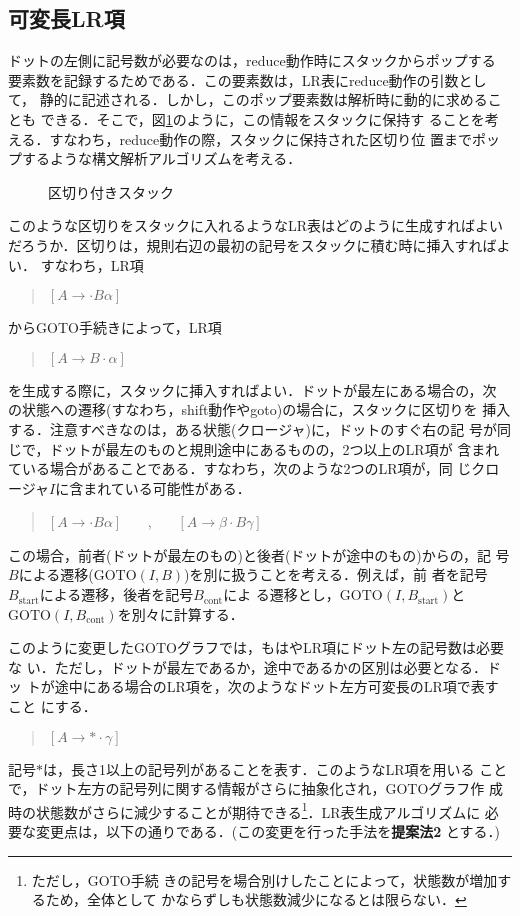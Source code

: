 \subsection{可変長LR項}

ドットの左側に記号数が必要なのは，reduce動作時にスタックからポップする
要素数を記録するためである．この要素数は，LR表にreduce動作の引数として，
静的に記述される．しかし，このポップ要素数は解析時に動的に求めることも
できる．そこで，図\ref{fig:stack}のように，この情報をスタックに保持す
ることを考える．すなわち，reduce動作の際，スタックに保持された区切り位
置までポップするような構文解析アルゴリズムを考える．

\begin{figure}
  \begin{center}
    \leavevmode
    \caption{区切り付きスタック}
    \label{fig:stack}
  \end{center}
\end{figure}

このような区切りをスタックに入れるようなLR表はどのように生成すればよい
だろうか．区切りは，規則右辺の最初の記号をスタックに積む時に挿入すればよい．
すなわち，LR項
\begin{quote}
  $[ A \rightarrow \cdot B \alpha ]$
\end{quote}
からGOTO手続きによって，LR項
\begin{quote}
  $[ A \rightarrow B \cdot \alpha ]$
\end{quote}
を生成する際に，スタックに挿入すればよい．ドットが最左にある場合の，次
の状態への遷移(すなわち，shift動作やgoto)の場合に，スタックに区切りを
挿入する．注意すべきなのは，ある状態(クロージャ)に，ドットのすぐ右の記
号が同じで，ドットが最左のものと規則途中にあるものの，2つ以上のLR項が
含まれている場合があることである．すなわち，次のような2つのLR項が，同
じクロージャ$I$に含まれている可能性がある．
\begin{quote}
  $[ A \rightarrow \cdot B \alpha ]$ ~~~,~~~ 
  $[ A \rightarrow \beta \cdot B \gamma ]$
\end{quote}
この場合，前者(ドットが最左のもの)と後者(ドットが途中のもの)からの，記
号$B$による遷移($\mbox{GOTO}(I,B)$)を別に扱うことを考える．例えば，前
者を記号$B_{\mbox{start}}$による遷移，後者を記号$B_{\mbox{cont}}$によ
る遷移とし，$\mbox{GOTO}(I,B_{\mbox{start}})$と
$\mbox{GOTO}(I,B_{\mbox{cont}})$を別々に計算する．

このように変更したGOTOグラフでは，もはやLR項にドット左の記号数は必要な
い．ただし，ドットが最左であるか，途中であるかの区別は必要となる．ドッ
トが途中にある場合のLR項を，次のようなドット左方可変長のLR項で表すこと
にする．
\begin{quote}
  $[ A \rightarrow * \cdot \gamma ]$
\end{quote}
記号$*$は，長さ1以上の記号列があることを表す．このようなLR項を用いる
ことで，ドット左方の記号列に関する情報がさらに抽象化され，GOTOグラフ作
成時の状態数がさらに減少することが期待できる\footnote{ただし，GOTO手続
  きの記号を場合別けしたことによって，状態数が増加するため，全体として
  かならずしも状態数減少になるとは限らない．}．LR表生成アルゴリズムに
必要な変更点は，以下の通りである．(この変更を行った手法を{\bf 提案法2}
とする．)

